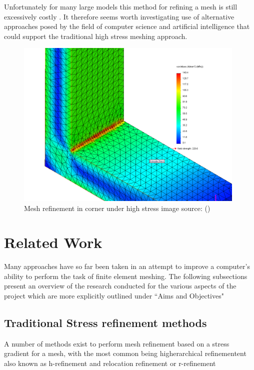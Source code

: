 \documentclass{article}
\begin{document}
\noindent
Unfortunately for many large models this method for refining a mesh is still excessively costly \cite{DolsakPaper91}. It therefore seems worth investigating use of alternative approaches posed by the field of computer science and artificial intelligence that could support the traditional high stress meshing approach. 

\begin{figure}
  \centerline{\includegraphics[width=110mm, scale=0.5]{stressedCorner.png}}
  \caption{Mesh refinement in corner under high stress image source: (\cite{HighStressCorner})}
  \label{fig:boat1}
\end{figure}

\section{Related Work}

Many approaches have so far been taken in an attempt to improve a computer's ability to perform the task of finite element meshing. The following subsections present an overview of the research conducted for the various aspects of the project which are more explicitly outlined under ``Aims and Objectives"

\subsection{Traditional Stress refinement methods}

A number of methods exist to perform mesh refinement based on a stress gradient for a mesh, with the most common being higherarchical refinementent also known as h-refinement and relocation refinement or r-refinement\cite{HandPRefinements} \cite{RRefinement}\\ 
\end{document}
